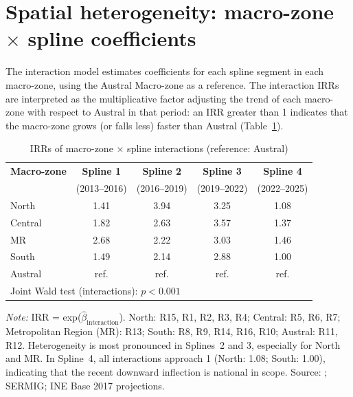 \documentclass[pdflatex,sn-basic]{sn-jnl}
\newcommand{\tablenote}[1]{%
  \vspace{2pt}\par
  {\footnotesize\textit{Note:} #1\par}
}
\begin{document}
\section{Spatial heterogeneity: macro-zone $\times$ spline coefficients}
\label{ap:macro}

The interaction model estimates coefficients for each spline segment in each
macro-zone, using the Austral Macro-zone as a reference. The interaction IRRs
are interpreted as the multiplicative factor adjusting the trend of each macro-zone
with respect to Austral in that period: an IRR greater than 1 indicates that the macro-zone grows
(or falls less) faster than Austral (Table~\ref{tab:macro}).

\begin{table}[htbp]
\centering
\caption{IRRs of macro-zone $\times$ spline interactions (reference: Austral)}
\label{tab:macro}
\small
\begin{tabular}{lcccc}
\toprule
\textbf{Macro-zone} & \textbf{Spline 1} & \textbf{Spline 2} & \textbf{Spline 3} & \textbf{Spline 4} \\
 & (2013--2016) & (2016--2019) & (2019--2022) & (2022--2025) \\
\midrule
North   & 1.41 & 3.94 & 3.25 & 1.08 \\
Central  & 1.82 & 2.63 & 3.57 & 1.37 \\
MR      & 2.68 & 2.22 & 3.03 & 1.46 \\
South     & 1.49 & 2.14 & 2.88 & 1.00 \\
Austral & ref. & ref. & ref. & ref. \\
\midrule
\multicolumn{5}{l}{Joint Wald test (interactions): $p < 0.001$} \\
\bottomrule
\end{tabular}
\tablenote{IRR = exp($\hat{\beta}_{\text{interaction}}$). North: R15, R1, R2, R3, R4;
Central: R5, R6, R7; Metropolitan Region (MR): R13; South: R8, R9, R14, R16, R10; Austral: R11, R12.
Heterogeneity is most pronounced in Splines~2 and 3, especially for North and
MR. In Spline~4, all interactions approach 1 (North: 1.08; South: 1.00),
indicating that the recent downward inflection is national in scope. Source:
\citet{INE2026}; SERMIG; INE Base 2017 projections.}
\end{table}

\end{document}
